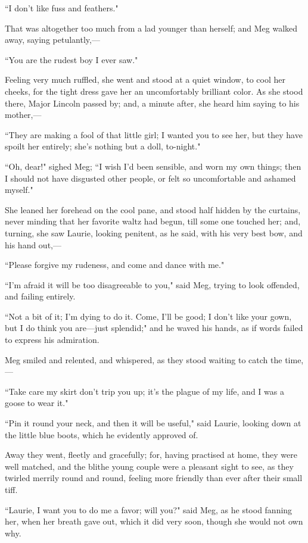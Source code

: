 ``I don't like fuss and feathers."

That was altogether too much from a lad younger than herself; and Meg
walked away, saying petulantly,---

``You are the rudest boy I ever saw."

Feeling very much ruffled, she went and stood at a quiet window, to cool
her cheeks, for the tight dress gave her an uncomfortably brilliant
color. As she stood there, Major Lincoln passed by; and, a minute after,
she heard him saying to his mother,---

``They are making a fool of that little girl; I wanted you to see her,
but they have spoilt her entirely; she's nothing but a
doll, to-night."

``Oh, dear!" sighed Meg; ``I wish I'd been sensible, and
worn my own things; then I should not have disgusted other people, or
felt so uncomfortable and ashamed myself."

She leaned her forehead on the cool pane, and stood half hidden by the
curtains, never minding that her favorite waltz had begun, till some one
touched her; and, turning, she saw Laurie, looking penitent, as he said,
with his very best bow, and his hand out,---

``Please forgive my rudeness, and come and dance with me."

``I'm afraid it will be too disagreeable to you," said
Meg, trying to look offended, and failing entirely.

``Not a bit of it; I'm dying to do it. Come,
I'll be good; I don't like your gown,
but I do think you are---just splendid;" and he waved his hands, as if
words failed to express his admiration.

Meg smiled and relented, and whispered, as they stood waiting to catch
the time,---

``Take care my skirt don't trip you up;
it's the plague of my life, and I was a goose to wear
it."

``Pin it round your neck, and then it will be useful," said Laurie,
looking down at the little blue boots, which he evidently approved of.

Away they went, fleetly and gracefully; for, having practised at home,
they were well matched, and the blithe young couple were a pleasant
sight to see, as they twirled merrily round and round, feeling more
friendly than ever after their small tiff.

``Laurie, I want you to do me a favor; will you?" said Meg, as he stood
fanning her, when her breath gave out, which it did very soon, though
she would not own why.

